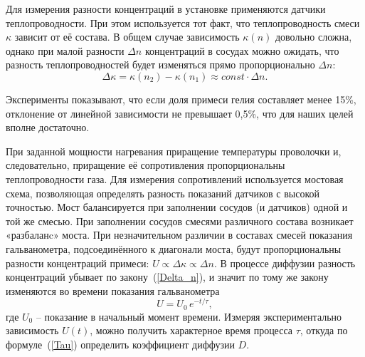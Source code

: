 \documentclass[a4paper,12pt]{article} %
\begin{document}
	Для измерения разности  концентраций  в установке применяются датчики теплопроводности. При этом используется тот факт, что теплопроводность смеси $\kappa$ зависит от её состава. В общем случае   зависимость  $\kappa (n)$  довольно   сложна,   однако   при   малой   разности  $\Delta n$ концентраций в сосудах можно ожидать, что разность теплопроводностей будет изменяться прямо пропорционально $\Delta n:$
	\begin{equation*}
		\Delta \kappa = \kappa (n_2) - \kappa (n_1) \approx const \cdot \Delta n.
	\end{equation*}	 
	
	Эксперименты показывают, что если доля примеси гелия составляет менее 15\%, отклонение от линейной зависимости не превышает 0,5\%, что для наших целей вполне достаточно.
	

	При заданной мощности нагревания приращение температуры  проволочки и, следовательно, приращение её сопротивления пропорциональны теплопроводности газа. Для измерения сопротивлений используется мостовая схема, позволяющая определять разность показаний датчиков с высокой точностью. Мост балансируется при заполнении сосудов (и датчиков) одной и той же смесью. При заполнении сосудов смесями различного состава возникает «разбаланc» моста. При незначительном различии в составах смесей показания гальванометра, подсоединённого к диагонали моста, будут пропорциональны разности концентраций примеси: $U\propto\Delta \kappa \propto \Delta n$. В процессе диффузии разность концентраций убывает по закону~(\ref{Delta_n}), и значит по тому же закону изменяются во времени показания гальванометра
	\begin{equation}
		U = U_0 \, e^{-t / \tau},
	\end{equation}		
	где $U_0$ -- показание в начальный момент времени. Измеряя экспериментально зависимость $U(t)$, можно получить характерное время процесса $\tau$, откуда по формуле~(\ref{Tau}) определить коэффициент диффузии $D$.
\end{document}
